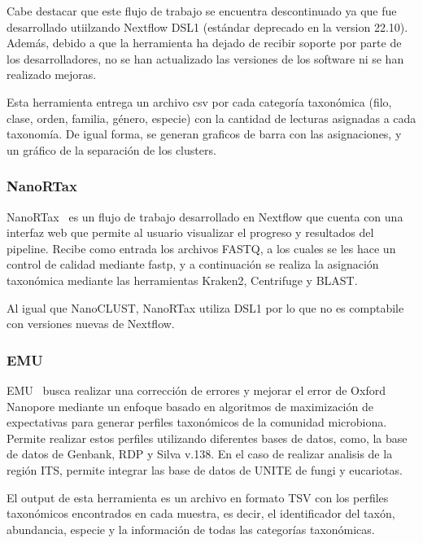 Cabe destacar que este flujo de trabajo se encuentra descontinuado ya que fue desarrollado utiilzando Nextflow DSL1 (estándar deprecado en la version 22.10). Además, debido a que la herramienta ha dejado de recibir soporte por parte de los desarrolladores, no se han actualizado las versiones de los software ni se han realizado mejoras.

Esta herramienta entrega un archivo csv por cada categoría taxonómica (filo, clase, orden, familia, género, especie) con la cantidad de lecturas asignadas a cada taxonomía. De igual forma, se generan graficos de barra con las asignaciones, y un gráfico de la separación de los clusters. 
\subsubsection{NanoRTax}

NanoRTax~\cite{RODRIGUEZPEREZ20225350} es un flujo de trabajo desarrollado en Nextflow que cuenta con una interfaz web que permite al usuario visualizar el progreso y resultados del pipeline.
Recibe como entrada los archivos FASTQ, a los cuales se les hace un control de calidad mediante fastp, y a continuación se realiza la asignación taxonómica mediante las herramientas Kraken2, Centrifuge y BLAST. 

Al igual que NanoCLUST, NanoRTax utiliza DSL1 por lo que no es comptabile con versiones nuevas de Nextflow.
\subsubsection{EMU}
EMU~\cite{curry2022emu} busca realizar una corrección de errores y mejorar el error de Oxford Nanopore mediante un enfoque basado en algoritmos de maximización de expectativas para generar perfiles taxonómicos de la comunidad microbiona. Permite realizar estos perfiles utilizando diferentes bases de datos, como, la base de datos de Genbank,  RDP y Silva v.138. En el caso de realizar analisis de la región ITS, permite integrar las base de datos de UNITE de fungi y eucariotas.

El output de esta herramienta es un archivo en formato TSV con los perfiles taxonómicos encontrados en cada muestra, es decir, el identificador del taxón, abundancia, especie y la información de todas las categorías taxonómicas. 




